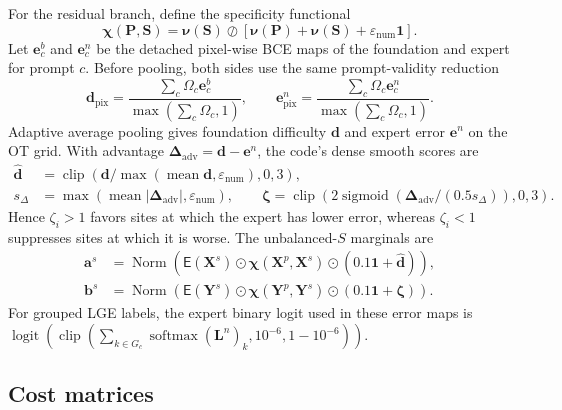 \documentclass[10pt]{article}
\newcommand{\epsnum}{\varepsilon_{\mathrm{num}}}
\newcommand{\ones}{\bm{1}}
\newcommand{\sigm}{\operatorname{sigmoid}}
\newcommand{\Norm}{\operatorname{Norm}}
\newcommand{\clip}{\operatorname{clip}}
\begin{document}
For the residual branch, define the specificity functional
\begin{equation}
    \bm\chi(\bm P,\bm S)
    =\bm\nu(\bm S)\oslash
      [\bm\nu(\bm P)+\bm\nu(\bm S)+\epsnum\ones].
\end{equation}
Let $\bm e_c^b$ and $\bm e_c^n$ be the detached pixel-wise BCE maps of the
foundation and expert for prompt $c$.  Before pooling, both sides use the same
prompt-validity reduction
\begin{equation}
 \bm d_{\mathrm{pix}}
 =\frac{\sum_c\Omega_c\bm e_c^b}{\max(\sum_c\Omega_c,1)},
 \qquad
 \bm e^n_{\mathrm{pix}}
 =\frac{\sum_c\Omega_c\bm e_c^n}{\max(\sum_c\Omega_c,1)}.
 \label{eq:valid-prompt-error-maps}
\end{equation}
Adaptive average pooling gives foundation difficulty $\bm d$ and expert error
$\bm e^n$ on the OT grid.  With advantage
$\bm\Delta_{\mathrm{adv}}=\bm d-\bm e^n$, the code's dense smooth scores are
\begin{equation}
\begin{aligned}
 \widehat{\bm d}
 &=\clip\!\left(
    \bm d/\max(\operatorname{mean}\bm d,\epsnum),0,3\right),\\
 s_{\Delta}&=\max(\operatorname{mean}|\bm\Delta_{\mathrm{adv}}|,\epsnum),\qquad
 \bm\zeta=\clip\!\left(
  2\sigm(\bm\Delta_{\mathrm{adv}}/(0.5s_{\Delta})),0,3\right).
\end{aligned}
\label{eq:matrix-s-gain}
\end{equation}
Hence $\zeta_i>1$ favors sites at which the expert has lower error, whereas
$\zeta_i<1$ suppresses sites at which it is worse.  The unbalanced-$S$ marginals
are
\begin{equation}
\begin{aligned}
 \bm a^s&=\Norm\!\left(
   \mathsf E(\bm X^s)\odot\bm\chi(\bm X^p,\bm X^s)
   \odot(0.1\ones+\widehat{\bm d})\right),\\
 \bm b^s&=\Norm\!\left(
   \mathsf E(\bm Y^s)\odot\bm\chi(\bm Y^p,\bm Y^s)
   \odot(0.1\ones+\bm\zeta)\right).
\end{aligned}
\label{eq:matrix-s-masses}
\end{equation}
For grouped LGE labels, the expert binary logit used in these error maps is
$\operatorname{logit}(\clip(\sum_{k\in G_c}\operatorname{softmax}
(\bm L^n)_k,10^{-6},1-10^{-6}))$.

\subsection{Cost matrices}
\end{document}
